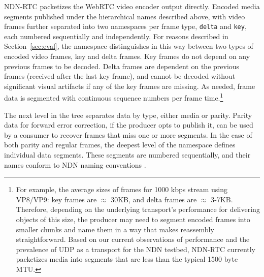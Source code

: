 \documentclass{icn/sig-alternate-2013} %
\newcommand{\ndnrtcName}{NDN-RTC} %
\begin{document}
\ndnrtcName{} packetizes the WebRTC video encoder output directly. Encoded media segments published under the hierarchical names described above, with video frames further separated into two namespaces per frame type, \texttt{delta} and \texttt{key}, each numbered sequentially and independently.  For reasons described in Section~\ref{sec:eval}, the namespace distinguishes in this way between two types of encoded video frames, key and delta frames. Key frames do not depend on any previous frames to be decoded. Delta frames are dependent on the previous frames (received after the last key frame), and cannot be decoded without significant visual artifacts if any of the key frames are missing. As needed, frame data is segmented with continuous sequence numbers per frame time.\footnote{For example, the average sizes of frames for 1000 kbps stream using VP8/VP9: key frames are $\approx$ 30KB, and delta frames are $\approx$ 3-7KB. Therefore, depending on the underlying transport's performance for delivering objects of this size, the producer may need to segment encoded frames into smaller chunks and name them in a way that makes reassembly straightforward. Based on our current observations of performance and the prevalence of UDP as a transport for the NDN testbed, \ndnrtcName{} currently packetizes media into segments that are less than the typical 1500 byte MTU.}


The next level in the tree separates data by type, either media or parity. Parity data for forward error correction, if the producer opts to publish it, can be used by a consumer to recover frames that miss one or more segments. 
In the case of both parity and regular frames, the deepest level of the namespace defines individual data segments. These segments are numbered sequentially, and their names conform to NDN naming conventions \cite{ndnnaming}.
\end{document}
